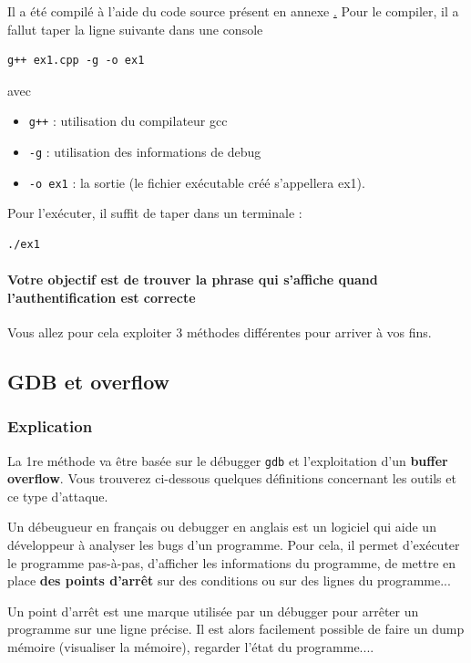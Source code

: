 \documentclass[french, 12pt]{article}%
\newcommand{\itemE}{\item[$\bullet$]}
\newcommand{\titreencadre}{Titre}
\newenvironment{encadre}[1]{\renewcommand{\titreencadre}{#1}
	\begin{mdframed}[style=encadrestyle]
	\vspace{0.5\baselineskip}
	}{%
	\end{mdframed}}
\begin{document}
Il a été compilé à l'aide du code source présent en annexe \href{lblEx1}.  Pour le compiler, il a fallut taper la ligne suivante dans une console 

\begin{lstlisting}[style=commande]
g++ ex1.cpp -g -o ex1
\end{lstlisting}

avec
\begin{itemize}
\itemE \verb?g++? : utilisation du compilateur gcc
\itemE \verb?-g? : utilisation des informations de debug
\itemE \verb?-o ex1? : la sortie (le fichier exécutable créé s'appellera ex1). 
\end{itemize}

Pour l'exécuter, il suffit de taper dans un terminale : 

\begin{lstlisting}[style=commande]
./ex1
\end{lstlisting}


\paragraph{Votre objectif est de trouver la phrase qui s'affiche quand l'authentification est correcte}

Vous allez pour cela exploiter 3 méthodes différentes pour arriver à vos fins. 


\subsection{GDB et overflow}
\subsubsection{Explication}
La 1re méthode va être basée sur le débugger \verb?gdb? et l'exploitation d'un \textbf{buffer overflow}. Vous trouverez ci-dessous quelques définitions concernant les outils et ce type d'attaque.
 
\begin{encadre}{Debugger}
Un débeugueur en français ou debugger en anglais est un logiciel qui aide un développeur à analyser les bugs d'un programme. Pour cela, il permet d'exécuter le programme pas-à-pas, d'afficher les informations du programme, de mettre en place \textbf{des points d'arrêt} sur des conditions ou sur des lignes du programme...
\end{encadre}


\begin{encadre}{Point d'arrêt}
Un point d'arrêt est une marque utilisée par un débugger pour arrêter un programme sur une ligne précise. Il est alors facilement possible de faire un dump mémoire (visualiser la mémoire), regarder l'état du programme....
\end{encadre}
 
\end{document}

